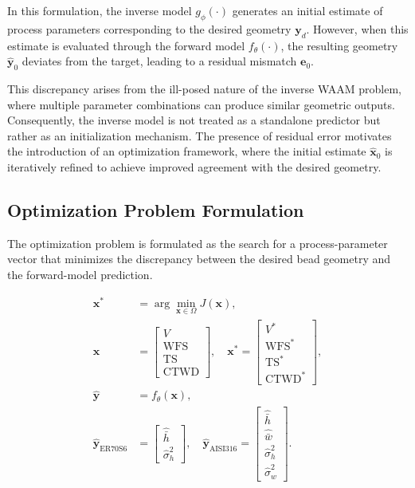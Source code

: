 \documentclass[11pt]{article}
\begin{document}
In this formulation, the inverse model $g_{\phi}(\cdot)$ generates an initial estimate of process parameters corresponding to the desired geometry $\mathbf{y}_d$. However, when this estimate is evaluated through the forward model $f_{\theta}(\cdot)$, the resulting geometry $\hat{\mathbf{y}}_{0}$ deviates from the target, leading to a residual mismatch $\mathbf{e}_0$. 

This discrepancy arises from the ill-posed nature of the inverse WAAM problem, where multiple parameter combinations can produce similar geometric outputs. Consequently, the inverse model is not treated as a standalone predictor but rather as an initialization mechanism. The presence of residual error motivates the introduction of an optimization framework, where the initial estimate $\hat{\mathbf{x}}_{0}$ is iteratively refined to achieve improved agreement with the desired geometry.

\subsection{Optimization Problem Formulation}

The optimization problem is formulated as the search for a process-parameter vector that minimizes the discrepancy between the desired bead geometry and the forward-model prediction.

\begin{tcolorbox}[colback=white,colframe=black,boxrule=0.5pt,arc=2pt]
\begin{equation}
\begin{aligned}
\mathbf{x}^{*} &= \arg\min_{\mathbf{x}\in\Omega} J(\mathbf{x}), \\
\mathbf{x} &=
\begin{bmatrix}
V \\
\mathrm{WFS} \\
\mathrm{TS} \\
\mathrm{CTWD}
\end{bmatrix}, \quad
\mathbf{x}^{*} =
\begin{bmatrix}
V^{*} \\
\mathrm{WFS}^{*} \\
\mathrm{TS}^{*} \\
\mathrm{CTWD}^{*}
\end{bmatrix}, \\
\hat{\mathbf{y}} &= f_{\theta}(\mathbf{x}), \\
\hat{\mathbf{y}}_{\mathrm{ER70S6}} &=
\begin{bmatrix}
\hat{\bar{h}} \\
\hat{\sigma}_{h}^{2}
\end{bmatrix}, \quad
\hat{\mathbf{y}}_{\mathrm{AISI316}} =
\begin{bmatrix}
\hat{\bar{h}} \\
\hat{\bar{w}} \\
\hat{\sigma}_{h}^{2} \\
\hat{\sigma}_{w}^{2}
\end{bmatrix}.
\end{aligned}
\end{equation}
\end{tcolorbox}
\end{document}
